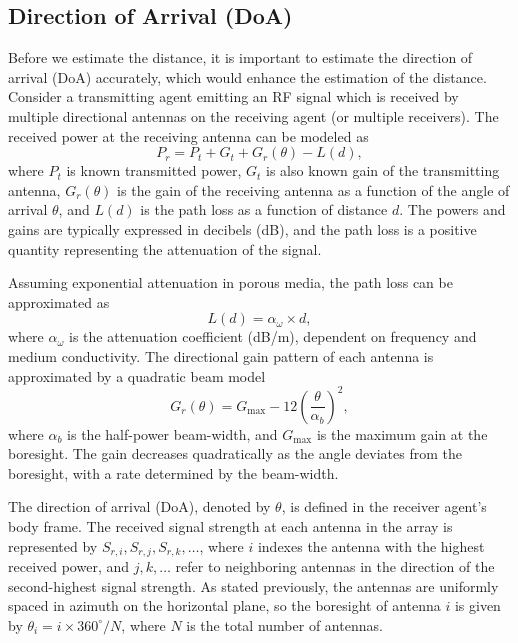 \documentclass[subscriptcorrection,upint,varvw,barcolor=Goldenrod3,mathalfa=cal=euler,balance,hyphenate,pdf-a]{asmejour}
\begin{document}
\subsection{Direction of Arrival (DoA)}
Before we estimate the distance, it is important to estimate the direction of arrival (DoA) accurately, which would enhance the estimation of the distance. Consider a transmitting agent emitting an RF signal which is received by multiple directional antennas on the receiving agent (or multiple receivers). 
The received power at the receiving antenna can be modeled as
\begin{equation}
P_r = P_t + G_t + G_r(\theta) - L(d),
\end{equation}
where $P_t$ is known transmitted power, $G_t$ is also known gain of the transmitting antenna, $G_r(\theta)$ is the gain of the receiving antenna as a function of the angle of arrival $\theta$, and $L(d)$ is the path loss as a function of distance $d$. The powers and gains are typically expressed in decibels (dB), and the path loss is a positive quantity representing the attenuation of the signal.

Assuming exponential attenuation in porous media, the path loss can be approximated as~\cite{vk5br1987}
\begin{equation}
L(d) = \alpha_\omega \times d,
\end{equation}
where $\alpha_\omega$ is the attenuation coefficient (dB/m), dependent on frequency and medium conductivity.
The directional gain pattern of each antenna is approximated by a quadratic beam model~\cite{stutzman2012antenna}
\begin{equation}
G_r(\theta) = G_{\max} - 12\left(\frac{\theta}{\alpha_b}\right)^2,
\end{equation}
where $\alpha_b$ is the half-power beam-width, and $G_{\max}$ is the maximum gain at the boresight. The gain decreases quadratically as the angle deviates from the boresight, with a rate determined by the beam-width.

The direction of arrival (DoA), denoted by $\theta$, is defined in the receiver agent’s body frame. The received signal strength at each antenna in the array is represented by $S_{r,i}, S_{r,j}, S_{r,k}, \dots$, where $i$ indexes the antenna with the highest received power, and $j, k, \dots$ refer to neighboring antennas in the direction of the second-highest signal strength. As stated previously, the antennas are uniformly spaced in azimuth on the horizontal plane, so the boresight of antenna $i$ is given by $\theta_i = i \times 360^\circ/N$, where $N$ is the total number of antennas. 
\end{document}
